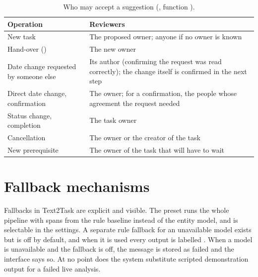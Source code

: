 \begin{table}[h]
\centering
\caption{Who may accept a suggestion (, function ).}
\label{tab:reviewer}
\footnotesize
\begin{tabularx}{\linewidth}{@{}p{46mm}L@{}}
\toprule
Operation & Reviewers \\
\midrule
New task & The proposed owner; anyone if no owner is known \\
Hand-over () & The new owner \\
Date change requested by someone else & Its author (confirming the request was read correctly); the change itself is confirmed in the next step \\
Direct date change, confirmation & The owner; for a confirmation, the people whose agreement the request needed \\
Status change, completion & The task owner \\
Cancellation & The owner or the creator of the task \\
New prerequisite & The owner of the task that will have to wait \\
\bottomrule
\end{tabularx}
\end{table}

\section{Fallback mechanisms}
Fallbacks in Text2Task are explicit and visible. The  preset runs the whole pipeline with spans from the rule baseline instead of the entity model, and is selectable in the settings. A separate rule fallback for an unavailable model exists but is off by default, and when it is used every output is labelled . When a model is unavailable and the fallback is off, the message is stored as failed and the interface says so. At no point does the system substitute scripted demonstration output for a failed live analysis.
